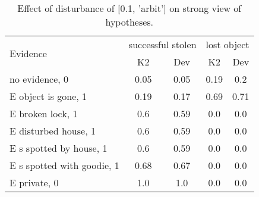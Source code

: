 \begin{table}\begin{tabular}{l|cc|cc}\toprule\multirow{2}{*}{Evidence} & \multicolumn{2}{c}{successful stolen}& \multicolumn{2}{c}{lost object}\\& {K2} & {Dev}& {K2} & {Dev}\\\midrule
no evidence, 0 & 0.05&0.05&0.19&0.2\\E object is gone, 1 & 0.19&0.17&0.69&0.71\\E broken lock, 1 & 0.6&0.59&0.0&0.0\\E disturbed house, 1 & 0.6&0.59&0.0&0.0\\E s spotted by house, 1 & 0.6&0.59&0.0&0.0\\E s spotted with goodie, 1 & 0.68&0.67&0.0&0.0\\E private, 0 & 1.0&1.0&0.0&0.0\\\bottomrule\end{tabular}\caption{Effect of disturbance of [0.1, 'arbit'] on strong view of hypotheses.}\end{table}